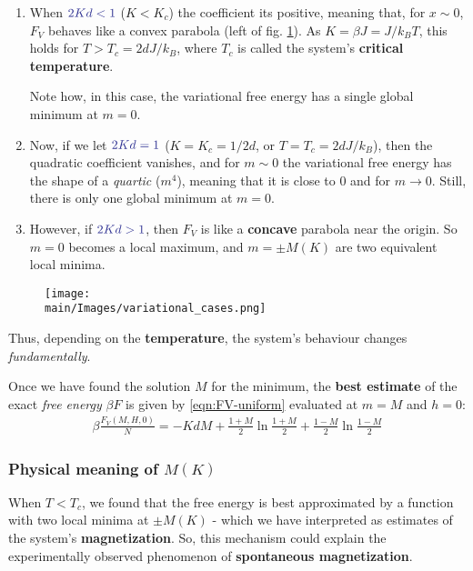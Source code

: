 \documentclass[../../main.tex]{subfiles}
\begin{document}
\begin{enumerate}
    \item When $\textcolor{Blue}{2Kd < 1}$ ($K < K_c$) the coefficient its positive, meaning that, for $x \sim 0$, $F_V$ behaves like a convex parabola (left of fig. \ref{fig:variational_cases}). As $K = \beta J = J/k_B T$, this holds for $T > T_c = 2d J/k_B$, where $T_c$ is called the system's \textbf{critical temperature}. 

    Note how, in this case, the variational free energy has a single global minimum at $m=0$.
    \item Now, if we let $\textcolor{Blue}{2Kd = 1}$ ($K=K_c = 1/2d$, or $T=T_c = 2dJ/k_B$), then the quadratic coefficient vanishes, and for $m \sim 0$ the variational free energy has the shape of a \textit{quartic} ($m^4$), meaning that it is close to $0$ and  for $m \to 0$. Still, there is only one global minimum at $m=0$.
    \item However, if $\textcolor{Blue}{2Kd > 1}$, then $F_V$ is like a \textbf{concave} parabola near the origin. So $m=0$ becomes a local maximum, and $m = \pm M(K)$ are two equivalent local minima. 
\end{enumerate}

\begin{figure}[H]
    \centering
    \texttt{[image: \\main/Images/variational\_cases.png]}
    \caption{} %
    \label{fig:variational_cases}
\end{figure}

Thus, depending on the \textbf{temperature}, the system's behaviour changes \textit{fundamentally}.  

\medskip

Once we have found the solution $M$ for the minimum, the \textbf{best estimate} of the exact \textit{free energy} $\beta F$ is given by \ref{eqn:FV-uniform} evaluated at $m=M$ and $h=0$:
\begin{align*}
    \beta \frac{F_V(M,H,0)}{N} = -K d M + \frac{1+M}{2} \ln \frac{1+M}{2} + \frac{1-M}{2} \ln \frac{1-M}{2}     
\end{align*}

\subsubsection{Physical meaning of $M(K)$}
When $T < T_c$, we found that the free energy is best approximated by a function with two local minima at $\pm M(K)$ - which we have interpreted as estimates of the system's \textbf{magnetization}. So, this mechanism could explain the experimentally observed phenomenon of \textbf{spontaneous magnetization}.
\end{document}
